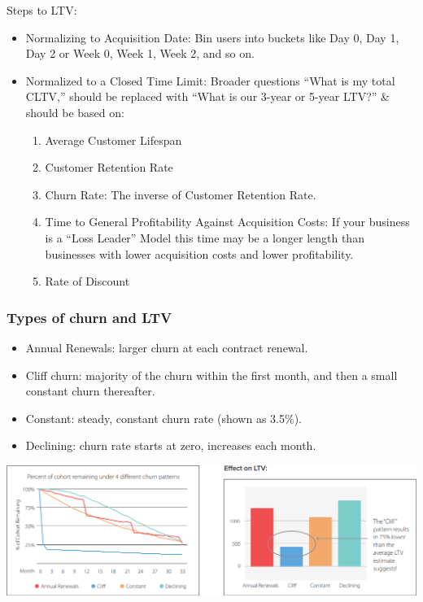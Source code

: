 \documentclass{beamer}
\begin{document}
\begin{frame}
	Steps to LTV:
	\begin{itemize}
		\item Normalizing to Acquisition Date: Bin users into buckets like Day 0, Day 1, Day 2 or Week 0, Week 1, Week 2, and so on.
		\item Normalized to a Closed Time Limit: Broader questions  “What is my total CLTV,” should be replaced with “What is our 3-year or 5-year LTV?” \& should be based on:
		\begin{enumerate}
			\item Average Customer Lifespan
			\item Customer Retention Rate
			\item Churn Rate: The inverse of Customer Retention Rate.
			\item Time to General Profitability Against Acquisition Costs: If your business is a “Loss Leader” Model this time may be a longer length than businesses with lower acquisition costs and lower profitability.
			\item Rate of Discount		
		\end{enumerate}

	\end{itemize}
\end{frame}

\begin{frame}\frametitle{Types of churn and LTV}
	\begin{itemize}
		\item Annual Renewals: larger churn at each contract renewal.
		\item Cliff churn: majority of the churn within the first month, and then a small constant churn thereafter.
		\item Constant: steady, constant churn rate (shown as 3.5\%).
		\item Declining: churn rate starts at zero, increases each month.
	\end{itemize}
	\includegraphics[scale=0.4]{churnltv}
\end{frame}
\end{document}
